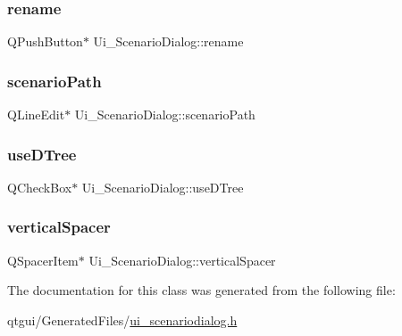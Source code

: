 \subsubsection{\texorpdfstring{rename}{rename}}
{\footnotesize\ttfamily Q\+Push\+Button$\ast$ Ui\+\_\+\+Scenario\+Dialog\+::rename}

\mbox{\label{class_ui___scenario_dialog_a5e6c7a4470198552a9e6bc0dfe61e236}} 
\subsubsection{\texorpdfstring{scenarioPath}{scenarioPath}}
{\footnotesize\ttfamily Q\+Line\+Edit$\ast$ Ui\+\_\+\+Scenario\+Dialog\+::scenario\+Path}

\mbox{\label{class_ui___scenario_dialog_adccab236c5dcd7163d47186fc2d498bd}} 
\subsubsection{\texorpdfstring{useDTree}{useDTree}}
{\footnotesize\ttfamily Q\+Check\+Box$\ast$ Ui\+\_\+\+Scenario\+Dialog\+::use\+D\+Tree}

\mbox{\label{class_ui___scenario_dialog_a0268aebc391a00421499440ee8637a67}} 
\subsubsection{\texorpdfstring{verticalSpacer}{verticalSpacer}}
{\footnotesize\ttfamily Q\+Spacer\+Item$\ast$ Ui\+\_\+\+Scenario\+Dialog\+::vertical\+Spacer}



The documentation for this class was generated from the following file\+:\begin{DoxyCompactItemize}
\item 
qtgui/\+Generated\+Files/\mbox{\hyperlink{ui__scenariodialog_8h}{ui\+\_\+scenariodialog.\+h}}\end{DoxyCompactItemize}
